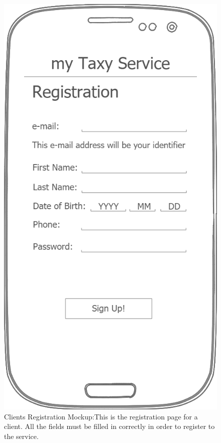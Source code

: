 \documentclass[a4paper]{article}
\begin{document}
\begin{enumerate}[label=\bfseries G\arabic*:]
\begin{figure}[H]
\includegraphics[width=\mockupWidth]{Mockup-ClientsRegistration}
\centering
\caption[Clients Registration Mockup]{Clients Registration Mockup:\newline This is the registration page for a client. All the fields must be filled in correctly in order to register to the service.}
\label{fig:mockupclientregistration}
\end{figure}


\end{enumerate}
\end{document}
